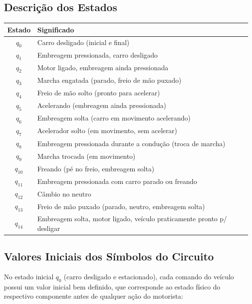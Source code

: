\documentclass[12pt,a4paper]{article}
\begin{document}
\subsection{Descrição dos Estados}
\begin{center}
\begin{tabular}{|c|l|}
    \hline
    \textbf{Estado} & \textbf{Significado} \\
    \hline
    $q_0$    & Carro desligado (inicial e final)                                    \\
    $q_1$    & Embreagem pressionada, carro desligado                               \\
    $q_2$    & Motor ligado, embreagem ainda pressionada                            \\
    $q_3$    & Marcha engatada (parado, freio de mão puxado)                        \\
    $q_4$    & Freio de mão solto (pronto para acelerar)                            \\
    $q_5$    & Acelerando (embreagem ainda pressionada)                             \\
    $q_6$    & Embreagem solta (carro em movimento acelerando)                      \\
    $q_7$    & Acelerador solto (em movimento, sem acelerar)                        \\
    $q_8$    & Embreagem pressionada durante a condução (troca de marcha)           \\
    $q_9$    & Marcha trocada (em movimento)                                        \\
    $q_{10}$ & Freando (pé no freio, embreagem solta)                               \\
    $q_{11}$ & Embreagem pressionada com carro parado ou freando                    \\
    $q_{12}$ & Câmbio no neutro                                                     \\
    $q_{13}$ & Freio de mão puxado (parado, neutro, embreagem solta)                \\
    $q_{14}$ & Embreagem solta, motor ligado, veículo praticamente pronto p/ desligar\\
    \hline
\end{tabular}
\end{center}

\subsection{Valores Iniciais dos Símbolos do Circuito}
No estado inicial $q_0$ (carro desligado e estacionado), cada comando do veículo possui um valor inicial bem definido, que corresponde ao estado físico do respectivo componente antes de qualquer ação do motorista:
\end{document}

